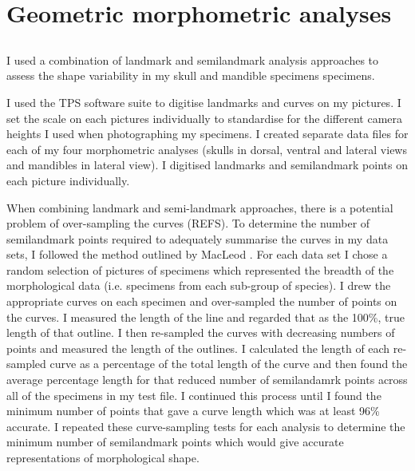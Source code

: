 \section{Geometric morphometric analyses}
\label{sect:morphometrics}

\subsection{}

	I used a combination of landmark and semilandmark analysis approaches to assess the shape variability in my skull and mandible specimens specimens. 

	I used the TPS software suite \citep{Rohlf2013} to digitise landmarks and curves on my pictures. I set the scale on each pictures individually to standardise for the different camera heights I used when photographing my specimens. I created separate data files for each of my four morphometric analyses (skulls in dorsal, ventral and lateral views and mandibles in lateral view). I digitised landmarks and semilandmark points on each picture individually.

	When combining landmark and semi-landmark approaches, there is a potential problem of over-sampling the curves (REFS). To determine the number of semilandmark points required to adequately summarise the curves in my data sets,  I followed the method outlined by MacLeod \citeyearpar{MacLeod2012}. For each data set I chose a random selection of pictures of specimens which represented the breadth of the morphological data (i.e. specimens from each sub-group of species). I drew the appropriate curves on each specimen and over-sampled the number of points on the curves. I measured the length of the line and regarded that as the 100\%, true length of that outline. I then re-sampled the curves with decreasing numbers of points and measured the length of the outlines. I calculated the length of each re-sampled curve as a percentage of the total length of the curve and then found the average percentage length for that reduced number of semilandamrk points across all of the specimens in my test file. I continued this process until I found the minimum number of points that gave a curve length which was at least 96\% accurate.  I repeated these curve-sampling tests for each analysis to determine the minimum number of semilandmark points which would give accurate representations of morphological shape.
	
